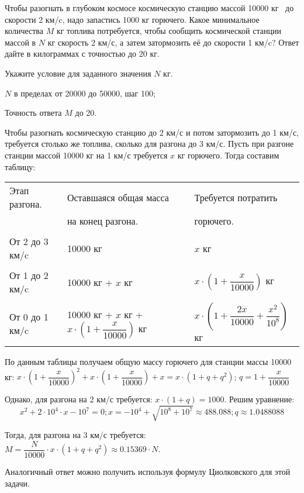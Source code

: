 
Чтобы разогнать в глубоком космосе
космическую станцию массой 10000 кг  до скорости
2 км/c, надо запастись 1000 кг горючего. Какое минимальное количества \linebreak $M$ кг топлива потребуется,
чтобы сообщить космической станции массой в $N$ кг скорость 2 км/с, 
а затем затормозить её до скорости 1 км/c? Ответ дайте в килограммах с точностью до 20 кг.

Укажите условие для заданного значения $N$ кг.

\paramSection

$N$ в пределах от 20000 до 50000, шаг 100;         

Точность ответа $M$  до  20.
\soultionSection

Чтобы разогнать космическую станцию до 2 км/с и потом затормозить до 1 км/с, требуется столько же топлива, 
сколько для разгона до 3 км/с. Пусть при разгоне станции массой 10000 кг  на 1 км/с требуется $x$ кг горючего. 
Тогда составим таблицу:
\begin{tabular}{l l l}
    Этап разгона. &	Оставшаяся общая масса  &	Требуется потратить \\
    & на конец разгона. & горючего.\\
    & & \\
    От 2 до 3 км/c & 	10000 кг  &  	$x$ кг\\
    & & \\
    От  1 до 2 км/c & 	10000 кг  + $x$ кг	 & $x \cdot \left( 1 + \dfrac{x}{10000}\right)$  кг\\
    & & \\
    От 0 до 1 км/c & 	10000 кг  + $x$ кг + $x \cdot \left( 1 + \dfrac{x}{10000}\right)$  кг	 & $x \cdot \left( 1 + \dfrac{2x}{10000} + \dfrac{x^2}{10^8}\right)$   кг\\
\end{tabular}

По данным таблицы получаем общую массу горючего для станции \linebreak массы 10000 кг:
$x \cdot \left( 1 + \dfrac{x}{10000}\right)^2+x \cdot \left( 1 +\dfrac{x}{10000}\right)+x=x  \cdot (1+q+q^2 )$;  
$q=1 +\dfrac{x}{10000}$ 

Однако, для разгона на 2 км/с требуется: $x  \cdot (1+q)=1000 $. Решим уравнение:
$$x^2+2 \cdot 10^4 \cdot x-10^7=0; x= -10^4+\sqrt{10^8+10^7}  \approx 488.088; q\approx 1.0488088 $$

Тогда, для разгона на 3 км/с требуется: $M=\dfrac{N}{10000} \cdot x \cdot (1+q+q^2 )\approx 0.15369 \cdot N.$

Аналогичный ответ можно получить используя формулу Циолковского для этой задачи.

